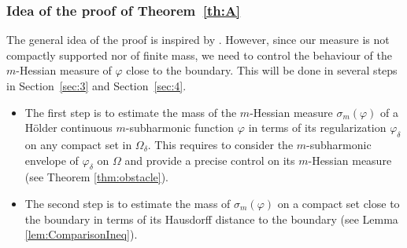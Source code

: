 \documentclass[JEP,XML,SOM,Unicode]{cedram}
\theoremstyle{definition}
\begin{document}
\subsubsection*{Idea of the proof of Theorem~\ref{th:A}}
The general idea of the proof is inspired by \cite{KN19}. However, since our measure is not compactly supported nor of finite mass, we need to control the behaviour of the $m$-Hessian measure of $\varphi$ close to the boundary. This will be done in several steps in Section~\ref{sec:3} and Section~\ref{sec:4}.
\begin{itemize}
\item
The first step is to estimate the mass of the $m$-Hessian measure $\sigma_m (\varphi)$ of a Hölder continuous $m$-subharmonic function $\varphi$ in terms of its regularization $\varphi_\delta$ on any compact set in $\Omega_\delta$. This requires to consider the $m$-subharmonic envelope of $\varphi_\delta$ on $\Omega$ and provide a precise control on its $m$-Hessian measure (see Theorem \ref{thm:obstacle}).

\item
The second step is to estimate the mass of $\sigma_m (\varphi)$ on a compact set close to the boundary in terms of its Hausdorff distance to the boundary (see Lemma \ref{lem:ComparisonIneq}).
\end{itemize}
\end{document}
